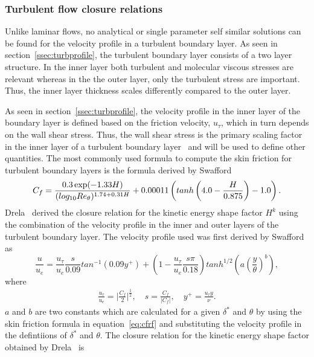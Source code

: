 \subsubsection{Turbulent flow closure relations}
Unlike laminar flows, no analytical or single parameter self similar solutions can be found for the velocity profile in a turbulent boundary layer. As seen in section~\ref{ssec:turbprofile}, the turbulent boundary layer consists of a two layer structure. In the inner layer both turbulent and molecular viscous stresses are relevant whereas in the the outer layer, only the turbulent stress are important. Thus, the inner layer thickness scales differently compared to the outer layer.

As seen in section~\ref{ssec:turbprofile}, the velocity profile in the inner layer of the boundary layer is defined based on the friction velocity, $u_{\tau}$, which in turn depends on the wall shear stress. Thus, the wall shear stress is the primary scaling factor in the inner layer of a turbulent boundary layer~\cite{drelaphdthesis} and will be used to define other quantities. The most commonly used formula to compute the skin friction for turbulent boundary layers is the formula derived by Swafford~\cite{swafford1979cf}
\begin{align}
\noindent C_f = \frac{0.3\exp(-1.33H)}{(log_{10}Re_{\theta})^{1.74+0.31H}} + 0.00011\left(tanh \left(4.0 - \frac{H}{0.875}\right) - 1.0\right).
    \label{eq:cfrf}
\end{align}
Drela~\cite{drelaphdthesis} derived the closure relation for the kinetic energy shape factor $H^k$ using the combination of the velocity profile in the inner and outer layers of the turbulent boundary layer. The velocity profile used was first derived by Swafford~\cite{swafford1979cf} as
\begin{equation}
\frac{u}{u_e} = \frac{u_{\tau}}{u_e}\frac{s}{0.09}tan^{-1}(0.09y^+) + \left(1- \frac{u_{\tau}}{u_e}\frac{s\pi}{0.18}\right)tanh^{1/2}\left(a\left(\frac{y}{\theta}\right)^b\right),
\end{equation}
where
\begin{align*}
\frac{u_{\tau}}{u_e} = \Bigg|\frac{C_f}{2}\Bigg|^{\frac{1}{2}}, \quad s = \frac{C_f}{|C_f|}, \quad y^+ = \frac{u_{\tau} y}{\nu}.
\end{align*}
$a$ and $b$ are two constants which are calculated for a given $\delta^{\ast}$ and $\theta$ by using the skin friction formula in equation~\ref{eq:cfrf} and substituting the velocity profile in the defintiions of $\delta^{\ast}$ and $\theta$. The closure relation for the kinetic energy shape factor obtained by Drela~\cite{drelaphdthesis} is
